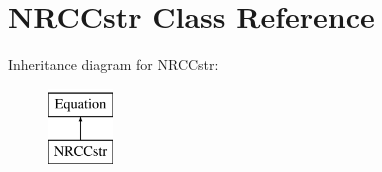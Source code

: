 \hypertarget{class_open_chams_1_1_n_r_c_cstr}{}\section{N\+R\+C\+Cstr Class Reference}
\label{class_open_chams_1_1_n_r_c_cstr}
Inheritance diagram for N\+R\+C\+Cstr\+:\begin{figure}[H]
\begin{center}
\leavevmode
\includegraphics[height=2.000000cm]{class_open_chams_1_1_n_r_c_cstr}
\end{center}
\end{figure}
